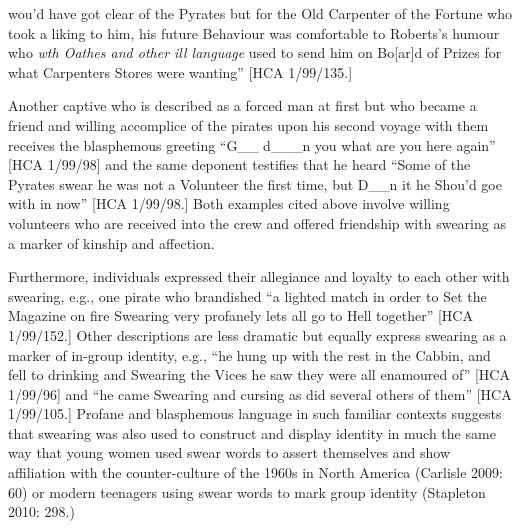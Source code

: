 \begin{styleStandard}
[he] wou’d have got clear of the Pyrates but for the Old Carpenter of the Fortune who took a liking to him, his future Behaviour was comfortable to Roberts’s humour who \textit{wth Oathes and other ill language} used to send him on Bo[ar]d of Prizes for what Carpenters Stores were wanting” [HCA 1/99/135.] 
\end{styleStandard}

\begin{styleStandard}
Another captive who is described as a forced man at first but who became a friend and willing accomplice of the pirates upon his second voyage with them receives the blasphemous greeting “G\_\_ d\_\_\_n you what are you here again” [HCA 1/99/98] and the same deponent testifies that he heard “Some of the Pyrates swear he was not a Volunteer the first time, but D\_\_n it he Shou’d goe with in now” [HCA 1/99/98.] Both examples cited above involve willing volunteers who are received into the crew and offered friendship with swearing as a marker of kinship and affection. 
\end{styleStandard}

\begin{styleStandard}
Furthermore, individuals expressed their allegiance and loyalty to each other with swearing, e.g., one pirate who brandished “a lighted match in order to Set the Magazine on fire Swearing very profanely lets all go to Hell together” [HCA 1/99/152.] Other descriptions are less dramatic but equally express swearing as a marker of in-group identity, e.g., “he hung up with the rest in the Cabbin, and fell to drinking and Swearing the Vices he saw they were all enamoured of” [HCA 1/99/96] and “he came Swearing and cursing as did several others of them” [HCA 1/99/105.] Profane and blasphemous language in such familiar contexts suggests that swearing was also used to construct and display identity in much the same way that young women used swear words to assert themselves and show affiliation with the counter-culture of the 1960s in North America (Carlisle 2009: 60) or modern teenagers using swear words to mark group identity (Stapleton 2010: 298.) 
\end{styleStandard}

